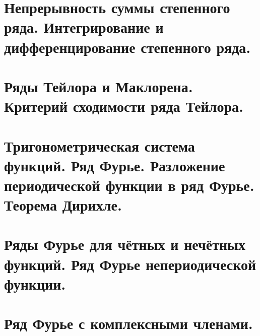 \documentclass{article}
\begin{document}
\begin{sloppypar}
\section{Непрерывность суммы степенного ряда. Интегрирование и дифференцирование степенного ряда.}

\section{Ряды Тейлора и Маклорена. Критерий сходимости ряда Тейлора.}

\section{Тригонометрическая система функций. Ряд Фурье. Разложение периодической функции в ряд Фурье. Теорема Дирихле.}

\section{Ряды Фурье для чётных и нечётных функций. Ряд Фурье непериодической функции.}

\section{Ряд Фурье с комплексными членами.}


\end{sloppypar}
\end{document}
